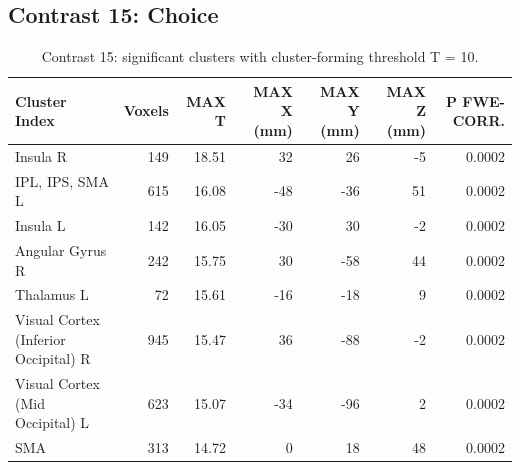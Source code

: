 \subsection{Contrast 15: Choice}

\begin{table}[htbp]
    \centering
    \begin{threeparttable}
    \caption{Contrast 15: significant clusters with cluster-forming threshold T = 10.}
    \begin{tabularx}{\textwidth}{l *{6}{R}}
        \toprule
        \textbf{Cluster Index} & \textbf{Voxels} & \textbf{MAX T} & \textbf{MAX X (mm)} & \textbf{MAX Y (mm}) & \textbf{MAX Z (mm)} & \textbf{P FWE-CORR.} \\
        \midrule
        Insula R & 149 & 18.51 & 32 & 26 & -5 & 0.0002 \\
IPL, IPS, SMA L & 615 & 16.08 & -48 & -36 & 51 & 0.0002 \\
Insula L & 142 & 16.05 & -30 & 30 & -2 & 0.0002 \\
Angular Gyrus R & 242 & 15.75 & 30 & -58 & 44 & 0.0002 \\
Thalamus L & 72 & 15.61 & -16 & -18 & 9 & 0.0002 \\
Visual Cortex (Inferior Occipital) R & 945 & 15.47 & 36 & -88 & -2 & 0.0002 \\
Visual Cortex (Mid Occipital) L & 623 & 15.07 & -34 & -96 & 2 & 0.0002 \\
SMA & 313 & 14.72 & 0 & 18 & 48 & 0.0002 \\
        \bottomrule
        \end{tabularx}
        \end{threeparttable}
        \label{tab:con15_pos}%
\end{table}%


